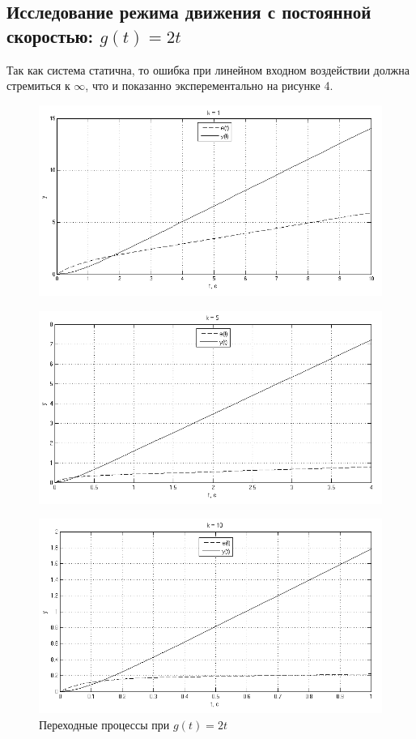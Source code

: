 \documentclass[a4paper, 11pt, russian]{article}
\begin{document}
    \subsection{Исследование режима движения с постоянной скоростью: $g(t) = 2t$}
    Так как система статична, то ошибка при линейном входном воздействии должна стремиться к $\infty$, что и показанно эксперементально на рисунке 4.
    
    \begin{figure}[h!]
        \centering
        \includegraphics[scale = 0.75]{vInput0ast1k.png}
    \end{figure}
    \begin{figure}[h!]
        \centering
        \includegraphics[scale = 0.75]{vInput0ast5k.png}
    \end{figure}
    \begin{figure}[ht!]
        \centering
        \includegraphics[scale = 0.75]{vInput0ast10k.png}
        \caption{Переходные процессы при $g(t) = 2t$}
    \end{figure}
    \vspace{1.5cm}
\end{document}
